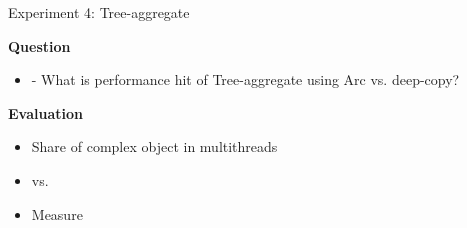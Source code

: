 \documentclass[9pt]{beamer}
\begin{document}

\begin{frame}[fragile]{Experiment 4: Tree-aggregate}

    \textbf{Question}
    \begin{itemize}
        \item - What is performance hit of Tree-aggregate using Arc vs. deep-copy?
    \end{itemize}

    \vspace{0.5cm}

    \textbf{Evaluation}
    \begin{itemize}
        \item Share  of complex object in multithreads
        \item {} vs. 
        \item Measure 
    \end{itemize}

\end{frame}



\end{document}
